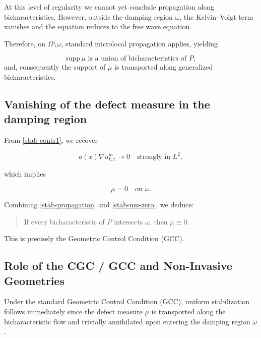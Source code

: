 \documentclass[11pt,letterpaper]{amsart}
\begin{document}
At this level of regularity we cannot yet conclude propagation along
bicharacteristics. However, outside the damping region $\omega$,
the Kelvin--Voigt term vanishes and the equation reduces to the free
wave equation.

Therefore, on $\Omega \setminus \omega$, standard microlocal propagation
applies, yielding

\begin{equation}
\mathrm{supp}\,\mu
\text{ is a union of bicharacteristics of } P,
\label{stab-propagation}
\end{equation}
and, consequently the support of $\mu$ is transported along generalized bicharacteristics.

\subsection{Vanishing of the defect measure in the damping region}

From \eqref{stab-contr1}, we recover

\[
a(x) \nabla u_{k,t}^m \longrightarrow 0 \quad \text{strongly in } L^2,
\]

which implies

\begin{equation}
\mu = 0 \quad \text{on } \omega.
\label{stab-mu-zero}
\end{equation}

Combining \eqref{stab-propagation} and \eqref{stab-mu-zero}, we deduce:

\begin{quote}
If every bicharacteristic of $P$ intersects $\omega$, then $\mu \equiv 0$.
\end{quote}

This is precisely the Geometric Control Condition (GCC).

\subsection{Role of the CGC / GCC and Non-Invasive Geometries}

Under the standard Geometric Control Condition (GCC), uniform stabilization follows immediately since the defect measure $\mu$ is transported along the bicharacteristic flow and trivially annihilated upon entering the damping region $\omega$.
\end{document}
